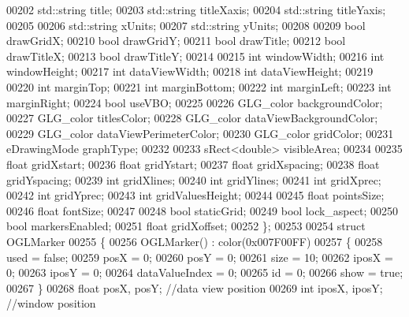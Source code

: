 \begin{DoxyCode}
00202     std::string title;
00203     std::string titleXaxis;
00204     std::string titleYaxis;
00205 
00206     std::string xUnits;
00207     std::string yUnits;
00208 
00209     \textcolor{keywordtype}{bool} drawGridX;
00210     \textcolor{keywordtype}{bool} drawGridY;
00211     \textcolor{keywordtype}{bool} drawTitle;
00212     \textcolor{keywordtype}{bool} drawTitleX;
00213     \textcolor{keywordtype}{bool} drawTitleY;
00214 
00215     \textcolor{keywordtype}{int} windowWidth;
00216     \textcolor{keywordtype}{int} windowHeight;
00217     \textcolor{keywordtype}{int} dataViewWidth;
00218     \textcolor{keywordtype}{int} dataViewHeight;
00219 
00220     \textcolor{keywordtype}{int} marginTop;
00221     \textcolor{keywordtype}{int} marginBottom;
00222     \textcolor{keywordtype}{int} marginLeft;
00223     \textcolor{keywordtype}{int} marginRight;
00224     \textcolor{keywordtype}{bool} useVBO;
00225 
00226     GLG_color backgroundColor;
00227     GLG_color titlesColor;
00228     GLG_color dataViewBackgroundColor;
00229     GLG_color dataViewPerimeterColor;
00230     GLG_color gridColor;
00231     eDrawingMode graphType;
00232 
00233     sRect<double> visibleArea;
00234 
00235     \textcolor{keywordtype}{float} gridXstart;
00236     \textcolor{keywordtype}{float} gridYstart;
00237     \textcolor{keywordtype}{float} gridXspacing;
00238     \textcolor{keywordtype}{float} gridYspacing;
00239     \textcolor{keywordtype}{int} gridXlines;
00240     \textcolor{keywordtype}{int} gridYlines;
00241     \textcolor{keywordtype}{int} gridXprec;
00242     \textcolor{keywordtype}{int} gridYprec;
00243     \textcolor{keywordtype}{int} gridValuesHeight;
00244 
00245     \textcolor{keywordtype}{float} pointsSize;
00246     \textcolor{keywordtype}{float} fontSize;
00247 
00248     \textcolor{keywordtype}{bool} staticGrid;
00249     \textcolor{keywordtype}{bool} lock_aspect;
00250     \textcolor{keywordtype}{bool} markersEnabled;
00251     \textcolor{keywordtype}{float} gridXoffset;
00252 \};
00253 
00254 \textcolor{keyword}{struct }OGLMarker
00255 \{
00256     OGLMarker() : color(0x007F00FF)
00257     \{
00258         used = \textcolor{keyword}{false};
00259         posX = 0;
00260         posY = 0;
00261         size = 10;
00262         iposX = 0;
00263         iposY = 0;
00264         dataValueIndex = 0;
00265         \textcolor{keywordtype}{id} = 0;
00266         show = \textcolor{keyword}{true};
00267     \}
00268     \textcolor{keywordtype}{float} posX, posY; \textcolor{comment}{//data view position}
00269     \textcolor{keywordtype}{int} iposX, iposY; \textcolor{comment}{//window position}

\end{DoxyCode}
